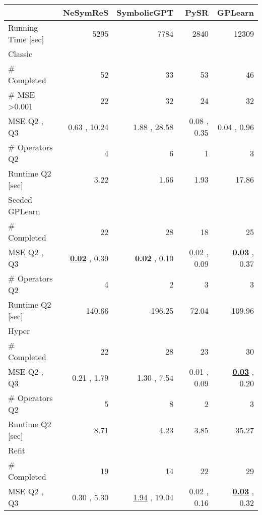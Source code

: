 \begin{tabularx}{\textwidth}{lRRRR}
\toprule
  &  NeSymReS  &  SymbolicGPT  &  PySR  &  GPLearn  \\ 
\midrule
Running Time [sec]  &  5295  &  7784  &  2840  &  12309  \\ 
Classic  &     &     &     &     \\ 
\qquad  \# Completed  &  52\phantom{.00}  &  33\phantom{.00}  &  53\phantom{.00}  &  46\phantom{.00}  \\ 
\qquad  \# MSE >0.001  &  22\phantom{.00}  &  32\phantom{.00}  &  24\phantom{.00}  &  32\phantom{.00}  \\ 
\qquad MSE Q2 ,  Q3  &  0.63  ,  10.24  &  1.88  ,  28.58  &  0.08  ,  0.35  &  0.04  ,  0.96  \\ 
\qquad \# Operators Q2  &  4\phantom{.00}  &  6\phantom{.00}  &  1\phantom{.00}  &  3\phantom{.00}  \\ 
\qquad Runtime Q2 [sec]  &  3.22  &  1.66  &  1.93  &  17.86  \\ 
Seeded GPLearn  &     &     &     &     \\ 
\qquad  \# Completed  &  22\phantom{.00}  &  28\phantom{.00}  &  18\phantom{.00}  &  25\phantom{.00}  \\ 
\qquad MSE Q2 ,  Q3  &  \underline{\textbf{0.02}}  ,  0.39  &  \textbf{0.02}  ,  0.10  &  0.02  ,  0.09  &  \underline{\textbf{0.03}}  ,  0.37  \\ 
\qquad \# Operators Q2  &  4\phantom{.00}  &  2\phantom{.00}  &  3\phantom{.00}  &  3\phantom{.00}  \\ 
\qquad Runtime Q2 [sec]  &  140.66  &  196.25  &  72.04  &  109.96  \\ 
Hyper  &     &     &     &     \\ 
\qquad  \# Completed  &  22\phantom{.00}  &  28\phantom{.00}  &  23\phantom{.00}  &  30\phantom{.00}  \\ 
\qquad MSE Q2 ,  Q3  &  0.21  ,  1.79  &  1.30  ,  7.54  &  0.01  ,  0.09  &  \underline{\textbf{0.03}}  ,  0.20  \\ 
\qquad \# Operators Q2  &  5\phantom{.00}  &  8\phantom{.00}  &  2\phantom{.00}  &  3\phantom{.00}  \\ 
\qquad Runtime Q2 [sec]  &  8.71  &  4.23  &  3.85  &  35.27  \\ 
Refit  &     &     &     &     \\ 
\qquad  \# Completed  &  19\phantom{.00}  &  14\phantom{.00}  &  22\phantom{.00}  &  29\phantom{.00}  \\ 
\qquad MSE Q2 ,  Q3  &  0.30  ,  5.30  &  \underline{1.94}  ,  19.04  &  0.02  ,  0.16  &  \underline{\textbf{0.03}}  ,  0.32  \\ 

\end{tabularx}
